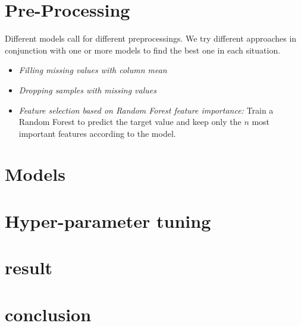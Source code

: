 \documentclass[letterpaper, 10 pt, conference]{ieeeconf}
\begin{document}
    \section{Pre-Processing}
    Different models call for different preprocessings. We try different approaches in conjunction with one or more models to find the best one in each situation.
    \begin{itemize}
        \item \textit{Filling missing values with column mean}
        \item \textit{Dropping samples with missing values}
        \item \textit{Feature selection based on Random Forest feature importance:} Train a Random Forest to predict the target value and  keep only the $n$ most important features according to the model. 
        
    \end{itemize} 
    
    \section{Models}
    
    \section{Hyper-parameter tuning}
    
    \section{result}
    
    \section{conclusion}
\end{document}
